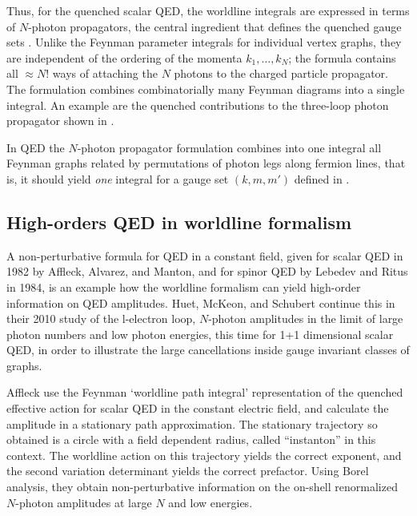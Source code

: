 Thus, for the quenched scalar QED, the worldline integrals are expressed
in terms of $N$-photon propagators, the central ingredient that defines
the quenched gauge sets .
Unlike the Feynman parameter integrals for individual vertex graphs, they are
independent of the ordering of the momenta $k_1,\ldots,k_N$; the formula
 contains all $\approx N!$ ways of attaching the $N$
photons to the charged particle propagator.
The formulation combines combinatorially many Feynman diagrams into a single integral.
An example are the quenched contributions to the
three-loop photon propagator shown in .

In QED the $N$-photon propagator formulation combines into one integral
all Feynman graphs related by permutations of photon legs along fermion
lines, that is, it should yield \emph{one} integral for a gauge set
$(k,m,m')$ defined in .

\subsection{High-orders QED in worldline formalism}
\label{sect:highQEDworldline}

A non-perturbative formula for QED in a constant field, given for scalar
QED in 1982 by Affleck, Alvarez, and Manton, and for spinor
QED by Lebedev and Ritus in 1984, is an example how the
worldline formalism can yield high-order information on QED amplitudes.
Huet, McKeon, and Schubert continue this in their 2010
study of the l-electron loop, $N$-photon amplitudes in the limit of large
photon numbers and low photon energies, this time for 1+1 dimensional
scalar QED, in order to illustrate the large cancellations inside gauge
invariant classes of graphs.

Affleck \etal{} use the Feynman `worldline
path integral' representation of the quenched effective action for scalar
QED in the constant electric field, and calculate the amplitude in a
stationary path approximation. The stationary trajectory so obtained is a
circle with a field dependent radius, called ``instanton''  in this
context. The worldline action on this trajectory yields the correct
exponent, and the second variation determinant yields the correct  prefactor.
Using Borel analysis, they obtain non-perturbative information on the
on-shell renormalized $N$-photon amplitudes at large $N$ and low energies.

